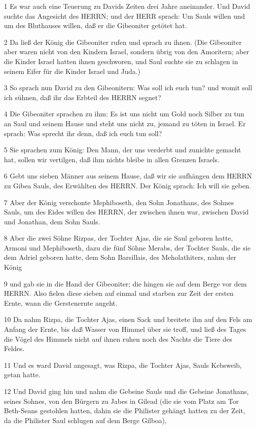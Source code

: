 \par 1 Es war auch eine Teuerung zu Davids Zeiten drei Jahre aneinander. Und David suchte das Angesicht des HERRN; und der HERR sprach: Um Sauls willen und um des Bluthauses willen, daß er die Gibeoniter getötet hat.
\par 2 Da ließ der König die Gibeoniter rufen und sprach zu ihnen. (Die Gibeoniter aber waren nicht von den Kindern Israel, sondern übrig von den Amoritern; aber die Kinder Israel hatten ihnen geschworen, und Saul suchte sie zu schlagen in seinem Eifer für die Kinder Israel und Juda.)
\par 3 So sprach nun David zu den Gibeonitern: Was soll ich euch tun? und womit soll ich sühnen, daß ihr das Erbteil des HERRN segnet?
\par 4 Die Gibeoniter sprachen zu ihm: Es ist uns nicht um Gold noch Silber zu tun an Saul und seinem Hause und steht uns nicht zu, jemand zu töten in Israel. Er sprach: Was sprecht ihr denn, daß ich euch tun soll?
\par 5 Sie sprachen zum König: Den Mann, der uns verderbt und zunichte gemacht hat, sollen wir vertilgen, daß ihm nichts bleibe in allen Grenzen Israels.
\par 6 Gebt uns sieben Männer aus seinem Hause, daß wir sie aufhängen dem HERRN zu Gibea Sauls, des Erwählten des HERRN. Der König sprach: Ich will sie geben.
\par 7 Aber der König verschonte Mephiboseth, den Sohn Jonathans, des Sohnes Sauls, um des Eides willen des HERRN, der zwischen ihnen war, zwischen David und Jonathan, dem Sohn Sauls.
\par 8 Aber die zwei Söhne Rizpas, der Tochter Ajas, die sie Saul geboren hatte, Armoni und Mephiboseth, dazu die fünf Söhne Merabs, der Tochter Sauls, die sie dem Adriel geboren hatte, dem Sohn Barsillais, des Meholathiters, nahm der König
\par 9 und gab sie in die Hand der Gibeoniter; die hingen sie auf dem Berge vor dem HERRN. Also fielen diese sieben auf einmal und starben zur Zeit der ersten Ernte, wann die Gerstenernte angeht.
\par 10 Da nahm Rizpa, die Tochter Ajas, einen Sack und breitete ihn auf den Fels am Anfang der Ernte, bis daß Wasser von Himmel über sie troff, und ließ des Tages die Vögel des Himmels nicht auf ihnen ruhen noch des Nachts die Tiere des Feldes.
\par 11 Und es ward David angesagt, was Rizpa, die Tochter Ajas, Sauls Kebsweib, getan hatte.
\par 12 Und David ging hin und nahm die Gebeine Sauls und die Gebeine Jonathans, seines Sohnes, von den Bürgern zu Jabes in Gilead (die sie vom Platz am Tor Beth-Seans gestohlen hatten, dahin sie die Philister gehängt hatten zu der Zeit, da die Philister Saul schlugen auf dem Berge Gilboa),
